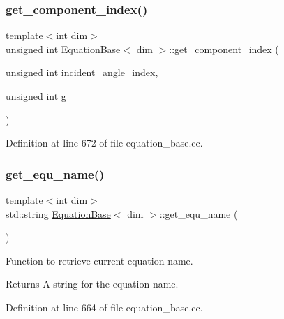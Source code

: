 \mbox{\label{class_equation_base_a03a5a22088edb15689e0041dcc6d323c}} 
\subsubsection{\texorpdfstring{get\+\_\+component\+\_\+index()}{get\_component\_index()}}
{\footnotesize\ttfamily template$<$int dim$>$ \\
unsigned int \hyperlink{class_equation_base}{Equation\+Base}$<$ dim $>$\+::get\+\_\+component\+\_\+index (\begin{DoxyParamCaption}\item[{unsigned int}]{incident\+\_\+angle\+\_\+index,  }\item[{unsigned int}]{g }\end{DoxyParamCaption})\hspace{0.3cm}{\ttfamily [virtual]}}



Definition at line 672 of file equation\+\_\+base.\+cc.

\mbox{\label{class_equation_base_abc4842a38ebb180b57ae11ec1325535c}} 
\subsubsection{\texorpdfstring{get\+\_\+equ\+\_\+name()}{get\_equ\_name()}}
{\footnotesize\ttfamily template$<$int dim$>$ \\
std\+::string \hyperlink{class_equation_base}{Equation\+Base}$<$ dim $>$\+::get\+\_\+equ\+\_\+name (\begin{DoxyParamCaption}{ }\end{DoxyParamCaption})}

Function to retrieve current equation name.

\begin{DoxyReturn}{Returns}
A string for the equation name. 
\end{DoxyReturn}


Definition at line 664 of file equation\+\_\+base.\+cc.

